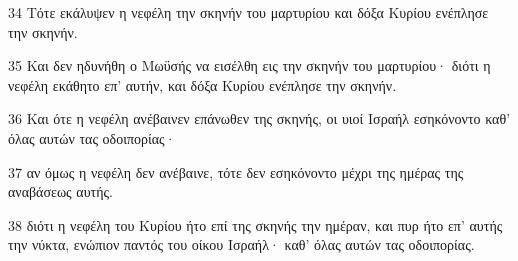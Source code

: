 \par 34 Τότε εκάλυψεν η νεφέλη την σκηνήν του μαρτυρίου και δόξα Κυρίου ενέπλησε την σκηνήν.
\par 35 Και δεν ηδυνήθη ο Μωϋσής να εισέλθη εις την σκηνήν του μαρτυρίου· διότι η νεφέλη εκάθητο επ' αυτήν, και δόξα Κυρίου ενέπλησε την σκηνήν.
\par 36 Και ότε η νεφέλη ανέβαινεν επάνωθεν της σκηνής, οι υιοί Ισραήλ εσηκόνοντο καθ' όλας αυτών τας οδοιπορίας·
\par 37 αν όμως η νεφέλη δεν ανέβαινε, τότε δεν εσηκόνοντο μέχρι της ημέρας της αναβάσεως αυτής.
\par 38 διότι η νεφέλη του Κυρίου ήτο επί της σκηνής την ημέραν, και πυρ ήτο επ' αυτής την νύκτα, ενώπιον παντός του οίκου Ισραήλ· καθ' όλας αυτών τας οδοιπορίας.



